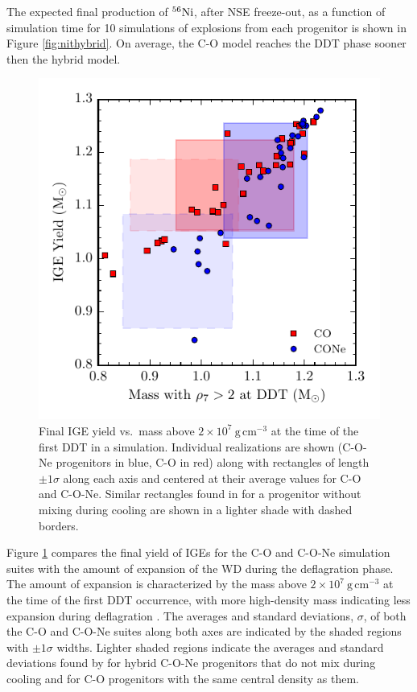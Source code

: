 \documentclass[preprint2]{aastex63}
\newcommand{\Ni}[1]{\ensuremath{{}^{#1}{\rm Ni}}}
\newcommand{\unitspace}{\ensuremath{\,}}
\newcommand{\usp}{\unitspace}
\newcommand{\unitstyle}[1]{\ensuremath{\mathrm{#1}}}
\newcommand{\power}[2]{\ensuremath{{#1}^{#2}}}
\newcommand{\centi}{\unitstyle{c}}
\newcommand{\meter}{\unitstyle{m}}
\newcommand{\cm}{\centi\meter}
\newcommand{\gram}{\unitstyle{g}}
\newcommand{\grampercc}{\gram\usp\power{\cm}{-3}} %
\begin{document}
The expected final production of \Ni{56}, after NSE freeze-out, as a function of simulation time
for 10 simulations of explosions from each progenitor is shown in Figure \ref{fig:nithybrid}.
On average, the C-O model reaches the DDT phase sooner then the
hybrid model.

\begin{figure}
\includegraphics[width=\columnwidth]{figures/ige_v_mass_at_high_dens.pdf}
\caption{\label{fig:masshighdens}
Final IGE yield
vs.\ mass above $2\times 10^7~\grampercc$
at the time of the first DDT in a simulation.  Individual
realizations are shown (C-O-Ne
progenitors in blue, C-O in red) along with rectangles of length
$\pm 1 \sigma$ along each axis and centered at their average values
for C-O and C-O-Ne.  Similar rectangles found in \citet{willcoxetal2016} for a progenitor without
mixing during cooling are shown in a lighter shade with dashed borders.
}
\end{figure}

Figure \ref{fig:masshighdens} compares the final yield of IGEs
for the C-O and C-O-Ne simulation suites with the amount of expansion of the
WD during the deflagration phase. The amount of expansion is
characterized by the mass above $2 \times 10^7~\grampercc$ at the
time of the first DDT occurrence, with more high-density mass
indicating less expansion during deflagration \citep{townetal2009}.
The averages and standard deviations, $\sigma$, of both
the C-O and C-O-Ne suites along both axes are indicated by the shaded
regions with $\pm1\sigma$ widths.
Lighter shaded regions indicate the averages and standard deviations found by \citet{willcoxetal2016} for hybrid C-O-Ne progenitors that do not mix during cooling and for C-O progenitors with the same central density as them.
\end{document}
